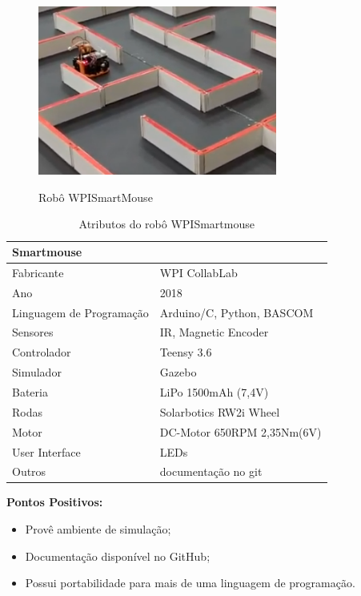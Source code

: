 \begin{figure}[H]
	\centering
	\caption{Robô WPISmartMouse}
	\includegraphics[width=0.7\textwidth]
	{Figures/WPISmartMouse_model.png}
	\label{fig:WPISmartMouse_model}
\end{figure}

\begin{table}[H]
	\centering
	\caption{Atributos do robô WPISmartmouse}
	\begin{tabular}{|l|l|}
		\hline
		\multicolumn{2}{|l|}{\textbf{Smartmouse}} \\ \hline
		Fabricante & WPI CollabLab \\ \hline
		Ano & 2018 \\ \hline
		Linguagem de Programação & Arduino/C, Python, BASCOM \\ \hline
		Sensores & IR, Magnetic Encoder \\ \hline
		Controlador & Teensy 3.6 \\ \hline
		Simulador & Gazebo \\ \hline
		Bateria & LiPo 1500mAh (7,4V) \\ \hline
		Rodas & Solarbotics RW2i Wheel \\ \hline
		Motor & DC-Motor 650RPM 2,35Nm(6V) \\ \hline
		User Interface & LEDs \\ \hline
		Outros & documentação no git \\ \hline
	\end{tabular}
	\label{tab:Smartmouse}
\end{table}

\textbf{Pontos Positivos:}
\begin{itemize}
	\item Provê ambiente de simulação;
	\item Documentação disponível no GitHub;
	\item Possui portabilidade para mais de uma linguagem de programação.
\end{itemize}


